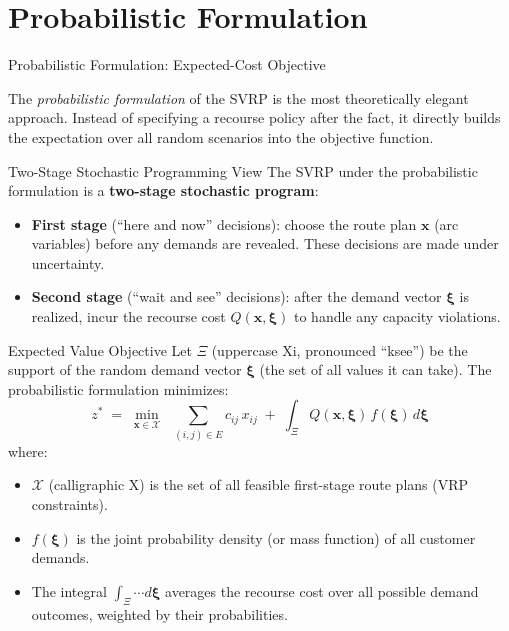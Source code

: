 \documentclass[aspectratio=169,10pt]{beamer}
\begin{document}
\section{Probabilistic Formulation}

\begin{frame}[allowframebreaks]{Probabilistic Formulation: Expected-Cost Objective}

  The \emph{probabilistic formulation} of the SVRP is the most theoretically
  elegant approach.  Instead of specifying a recourse policy after the fact,
  it directly builds the expectation over all random scenarios into the
  objective function.

  \begin{block}{Two-Stage Stochastic Programming View}
    The SVRP under the probabilistic formulation is a
    \textbf{two-stage stochastic program}:
    \begin{itemize}
      \item \textbf{First stage} (``here and now'' decisions): choose the
            route plan $\mathbf{x}$ (arc variables) before any demands
            are revealed.  These decisions are made under uncertainty.
      \item \textbf{Second stage} (``wait and see'' decisions): after the
            demand vector $\boldsymbol{\xi}$ is realized, incur the
            recourse cost $Q(\mathbf{x}, \boldsymbol{\xi})$ to handle
            any capacity violations.
    \end{itemize}
  \end{block}

  \framebreak

  \begin{block}{Expected Value Objective}
    Let $\Xi$ (uppercase Xi, pronounced ``ksee'') be the support of the
    random demand vector $\boldsymbol{\xi}$ (the set of all values it can
    take).
    The probabilistic formulation minimizes:
    \[
      z^* \;=\; \min_{\mathbf{x} \in \mathcal{X}} \;\;
        \sum_{(i,j)\in E} c_{ij}\, x_{ij}
        \;+\; \int_{\Xi} Q(\mathbf{x}, \boldsymbol{\xi})\,
               f(\boldsymbol{\xi})\, d\boldsymbol{\xi}
    \]
    where:
    \begin{itemize}
      \item $\mathcal{X}$ (calligraphic X) is the set of all feasible
            first-stage route plans (VRP constraints).
      \item $f(\boldsymbol{\xi})$ is the joint probability density (or
            mass function) of all customer demands.
      \item The integral $\int_\Xi \cdots d\boldsymbol{\xi}$ averages the
            recourse cost over all possible demand outcomes, weighted by
            their probabilities.
    \end{itemize}
  \end{block}


\end{frame}
\end{document}
